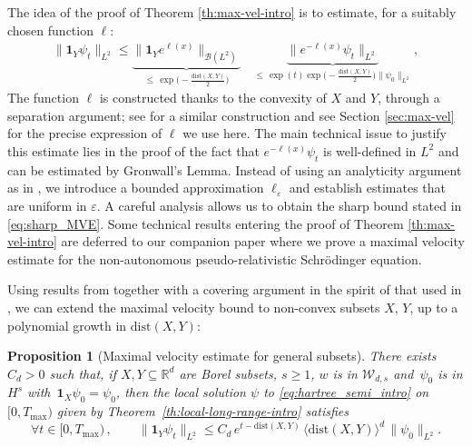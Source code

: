 \documentclass[12pt]{article}
\newcommand{\dXY}{{\mathrm{dist}(X,Y)}}
\theoremstyle{plain}
\newtheorem{prop}[theo]{Proposition}
\newcommand{\setW}{{\mathcal{W}_{d,s}}}
\begin{document}
The idea of the proof of Theorem \ref{th:max-vel-intro} is to estimate, for a suitably chosen function $\ell$:
\begin{align*}
\|\mathbf{1}_Y \psi_t\|_{L^2}
    \le \underset{\le\, \exp\big(-\frac{\dXY}{2}\big)}{\underbrace{\|\mathbf{1}_Ye^{\ell(x)}\|_{\mathcal{B}(L^2)}}} \quad
    \underset{\le\,  \exp(t)\exp\big(-\frac{\dXY}{2}\big)\|\psi_0\|_{L^2}}{\underbrace{\|e^{-\ell(x)}\psi_t\|_{L^2}}}
   \,,%
\end{align*}
The function $\ell$ is constructed thanks to the convexity of $X$ and $Y$, through a separation argument; see \cite{FaupinLemmSigalZhang25} for a similar construction and see Section \ref{sec:max-vel} for the precise expression of $\ell$ we use here. The main technical issue to justify this estimate lies in the proof of the fact that $e^{-\ell(x)}\psi_t$ is well-defined in $L^2$ and can be estimated by Gronwall's Lemma. Instead of using an analyticity argument as in \cite{SigalWu}, we introduce a bounded approximation $\ell_\varepsilon$ and establish estimates that are uniform in $\varepsilon$. A careful analysis allows us to obtain the sharp bound stated in \eqref{eq:sharp_MVE}. Some technical results entering the proof of Theorem \ref{th:max-vel-intro} are deferred to our companion paper \cite{BFG2a} where we prove a maximal velocity estimate for the non-autonomous pseudo-relativistic Schrödinger equation.


Using results from \cite{BFG2a} together with a covering argument in the spirit of that used in \cite{SigalWu}, we can extend the maximal velocity bound to non-convex subsets $X$, $Y$, up to a polynomial growth in $\mathrm{dist}(X,Y)$:


\begin{prop}[Maximal velocity estimate for general subsets]\label{th:max-vel-general-intro1}
There exists~$C_d>0$ such that, if $X,Y\subseteq\mathbb{R}^d$ are Borel subsets, $s\ge 1$, $w$ is in $\setW$ and~$\psi_0$ is in $H^{s}$ with~$\mathbf{1}_X\psi_0=\psi_0$, then the local solution $\psi$ to \eqref{eq:hartree_semi_intro} on $[0,T_{\mathrm{max}})$ given by Theorem~\ref{th:local-long-range-intro}  satisfies
    \begin{equation}\label{eq:general_MVE}
       \forall t\in[0,T_{\max})\,,\qquad \|\mathbf{1}_Y\psi_t\|_{L^2}\le C_d \, e^{t-\dXY} \, \langle\dXY\rangle^d \, \|\psi_0\|_{L^2}.
    \end{equation}
\end{prop}
\end{document}
